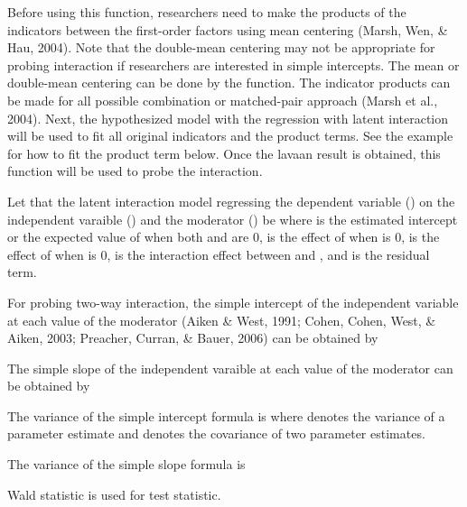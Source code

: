 \documentclass[a4paper]{book}
\begin{document}
%
\begin{Details}\relax
Before using this function, researchers need to make the products of the indicators between the first-order factors using mean centering (Marsh, Wen, \& Hau, 2004). Note that the double-mean centering may not be appropriate for probing interaction if researchers are interested in simple intercepts. The mean or double-mean centering can be done by the  function. The indicator products can be made for all possible combination or matched-pair approach (Marsh et al., 2004). Next, the hypothesized model with the regression with latent interaction will be used to fit all original indicators and the product terms. See the example for how to fit the product term below. Once the lavaan result is obtained, this function will be used to probe the interaction.

Let that the latent interaction model regressing the dependent variable () on the independent varaible () and the moderator () be
where  is the estimated intercept or the expected value of  when both  and  are 0,  is the effect of  when  is 0,  is the effect of  when  is 0,  is the interaction effect between  and , and  is the residual term.

For probing two-way interaction, the simple intercept of the independent variable at each value of the moderator (Aiken \& West, 1991; Cohen, Cohen, West, \& Aiken, 2003; Preacher, Curran, \& Bauer, 2006) can be obtained by

The simple slope of the independent varaible at each value of the moderator can be obtained by

The variance of the simple intercept formula is
where  denotes the variance of a parameter estimate and  denotes the covariance of two parameter estimates.

The variance of the simple slope formula is 

Wald statistic is used for test statistic.
\end{Details}
%
\end{document}
